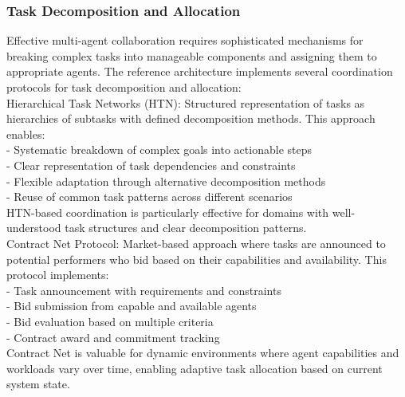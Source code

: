 \subsubsection{Task Decomposition and Allocation}
Effective multi-agent collaboration requires sophisticated mechanisms for breaking complex tasks into manageable components and assigning them to appropriate agents. The reference architecture implements several coordination protocols for task decomposition and allocation:\\ \newline
Hierarchical Task Networks (HTN): Structured representation of tasks as hierarchies of subtasks with defined decomposition methods. This approach enables:\\ \newline
- Systematic breakdown of complex goals into actionable steps\\ \newline
- Clear representation of task dependencies and constraints\\ \newline
- Flexible adaptation through alternative decomposition methods\\ \newline
- Reuse of common task patterns across different scenarios\\ \newline
HTN-based coordination is particularly effective for domains with well-understood task structures and clear decomposition patterns.\\ \newline
Contract Net Protocol: Market-based approach where tasks are announced to potential performers who bid based on their capabilities and availability. This protocol implements:\\ \newline
- Task announcement with requirements and constraints\\ \newline
- Bid submission from capable and available agents\\ \newline
- Bid evaluation based on multiple criteria\\ \newline
- Contract award and commitment tracking\\ \newline
Contract Net is valuable for dynamic environments where agent capabilities and workloads vary over time, enabling adaptive task allocation based on current system state.\\ \newline
